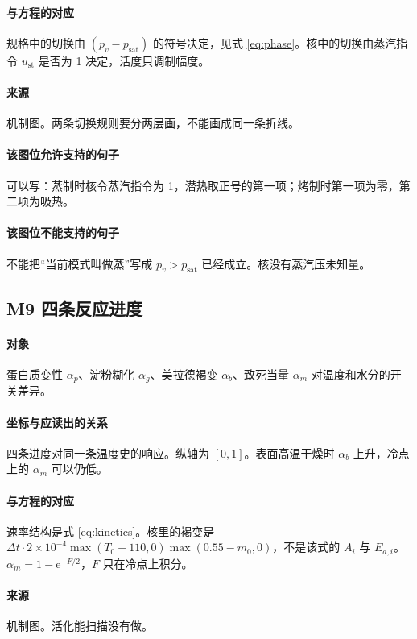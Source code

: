 \paragraph{与方程的对应}
规格中的切换由 $(p_v-p_{\mathrm{sat}})$ 的符号决定，见式 \eqref{eq:phase}。核中的切换由蒸汽指令 $u_{\mathrm{st}}$ 是否为 1 决定，活度只调制幅度。

\paragraph{来源}
机制图。两条切换规则要分两层画，不能画成同一条折线。

\paragraph{该图位允许支持的句子}
可以写：蒸制时核令蒸汽指令为 1，潜热取正号的第一项；烤制时第一项为零，第二项为吸热。

\paragraph{该图位不能支持的句子}
不能把“当前模式叫做蒸”写成 $p_v>p_{\mathrm{sat}}$ 已经成立。核没有蒸汽压未知量。

\subsection{M9 四条反应进度}
\paragraph{对象}
蛋白质变性 $\alpha_p$、淀粉糊化 $\alpha_g$、美拉德褐变 $\alpha_b$、致死当量 $\alpha_m$ 对温度和水分的开关差异。

\paragraph{坐标与应读出的关系}
四条进度对同一条温度史的响应。纵轴为 $[0,1]$。表面高温干燥时 $\alpha_b$ 上升，冷点上的 $\alpha_m$ 可以仍低。

\paragraph{与方程的对应}
速率结构是式 \eqref{eq:kinetics}。核里的褐变是 $\Delta t\cdot 2\times 10^{-4}\max(T_0-110,0)\max(0.55-m_0,0)$，不是该式的 $A_i$ 与 $E_{a,i}$。$\alpha_m=1-\mathrm{e}^{-F/2}$，$F$ 只在冷点上积分。

\paragraph{来源}
机制图。活化能扫描没有做。

